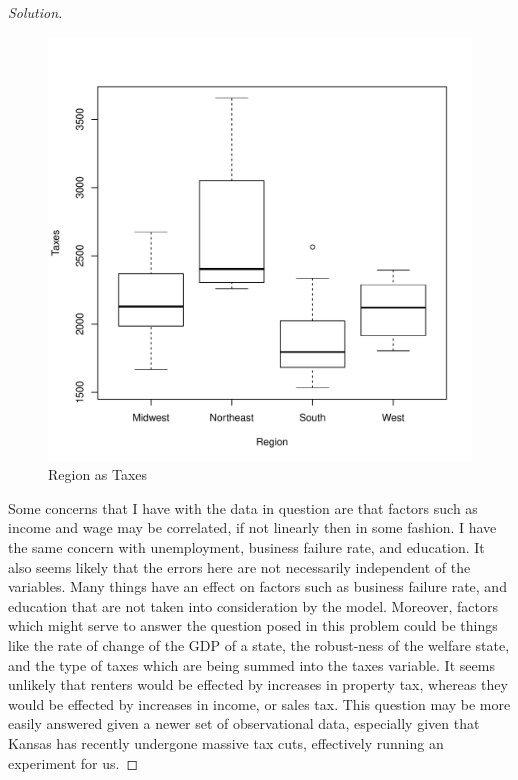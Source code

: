 \documentclass{amsart}\usepackage[]{graphicx}\usepackage[]{color}
\newenvironment{knitrout}{}{} %
\begin{document}
\begin{proof}[Solution]
        \begin{figure}[h]
\begin{knitrout}
\color{fgcolor}
\includegraphics[width=.7\linewidth]{figure/2_Fig3-1} 

\end{knitrout}
        \caption{Region as Taxes}
        \end{figure}
        Some concerns that I have with the data in question are that factors such as income and wage may be correlated, if not linearly then in some fashion.
        I have the same concern with unemployment, business failure rate, and education.
        It also seems likely that the errors here are not necessarily independent of the variables.
        Many things have an effect on factors such as business failure rate, and education that are not taken into consideration by the model.
        Moreover, factors which might serve to answer the question posed in this problem could be things like the rate of change of the GDP of a state, the robust-ness of the welfare state, and the type of taxes which are being summed into the taxes variable.
        It seems unlikely that renters would be effected by increases in property tax, whereas they would be effected by increases in income, or sales tax.
        This question may be more easily answered given a newer set of observational data, especially given that Kansas has recently undergone massive tax cuts, effectively running an experiment for us.
		\end{proof}
		\newpage
\end{document}
